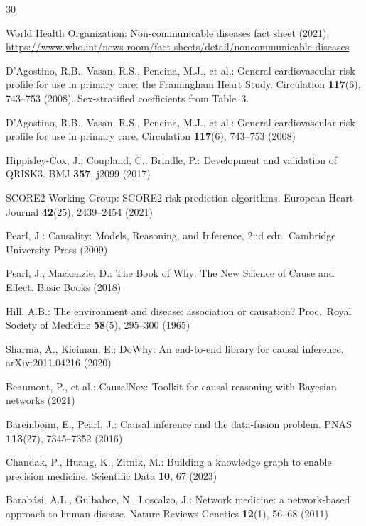 \documentclass[runningheads]{llncs}
\begin{document}
\begin{thebibliography}{30}

World Health Organization:
Non-communicable diseases fact sheet (2021).
\url{https://www.who.int/news-room/fact-sheets/detail/noncommunicable-diseases}

D'Agostino, R.B., Vasan, R.S., Pencina, M.J., et al.:
General cardiovascular risk profile for use in primary care:
the Framingham Heart Study.
Circulation \textbf{117}(6), 743--753 (2008).
Sex-stratified coefficients from Table~3.

D'Agostino, R.B., Vasan, R.S., Pencina, M.J., et al.:
General cardiovascular risk profile for use in primary care.
Circulation \textbf{117}(6), 743--753 (2008)

Hippisley-Cox, J., Coupland, C., Brindle, P.:
Development and validation of QRISK3.
BMJ \textbf{357}, j2099 (2017)

SCORE2 Working Group:
SCORE2 risk prediction algorithms.
European Heart Journal \textbf{42}(25), 2439--2454 (2021)

Pearl, J.:
Causality: Models, Reasoning, and Inference, 2nd edn.
Cambridge University Press (2009)

Pearl, J., Mackenzie, D.:
The Book of Why: The New Science of Cause and Effect.
Basic Books (2018)

Hill, A.B.:
The environment and disease: association or causation?
Proc.\ Royal Society of Medicine \textbf{58}(5), 295--300 (1965)

Sharma, A., Kiciman, E.:
DoWhy: An end-to-end library for causal inference.
arXiv:2011.04216 (2020)

Beaumont, P., et al.:
CausalNex: Toolkit for causal reasoning with Bayesian networks (2021)

Bareinboim, E., Pearl, J.:
Causal inference and the data-fusion problem.
PNAS \textbf{113}(27), 7345--7352 (2016)

Chandak, P., Huang, K., Zitnik, M.:
Building a knowledge graph to enable precision medicine.
Scientific Data \textbf{10}, 67 (2023)

Barab\'{a}si, A.L., Gulbahce, N., Loscalzo, J.:
Network medicine: a network-based approach to human disease.
Nature Reviews Genetics \textbf{12}(1), 56--68 (2011)


\end{thebibliography}
\end{document}
